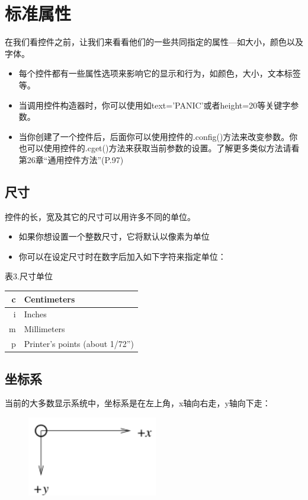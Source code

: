 \chapter{标准属性}


在我们看控件之前，让我们来看看他们的一些共同指定的属性---如大小，颜色以及字体。
\begin{itemize}
\item
每个控件都有一些属性选项来影响它的显示和行为，如颜色，大小，文本标签等。
\item
当调用控件构造器时，你可以使用如text='PANIC'或者height=20等关键字参数。
\item
当你创建了一个控件后，后面你可以使用控件的.config()方法来改变参数。你也可以使用控件的.cget()方法来获取当前参数的设置。了解更多类似方法请看第26章“通用控件方法”(P.97)
\end{itemize}

\section{尺寸}

控件的长，宽及其它的尺寸可以用许多不同的单位。
\begin{itemize}
\item
如果你想设置一个整数尺寸，它将默认以像素为单位
\item
你可以在设定尺寸时在数字后加入如下字符来指定单位：
\end{itemize}
\hspace{4em}
表3.尺寸单位

\hspace{2em}
\begin{tabular}{r|l}
\hline
c & Centimeters \\ \hline
i & Inches \\ \hline
m & Millimeters \\ \hline
p & Printer's points (about 1/72'') \\ \hline
\end{tabular}

\section{坐标系}
当前的大多数显示系统中，坐标系是在左上角，x轴向右走，y轴向下走：

\begin{figure}[H]
\hspace{1em}
\includegraphics[width=5.680cm,height=3.457cm]{5.2.png}
\end{figure}

